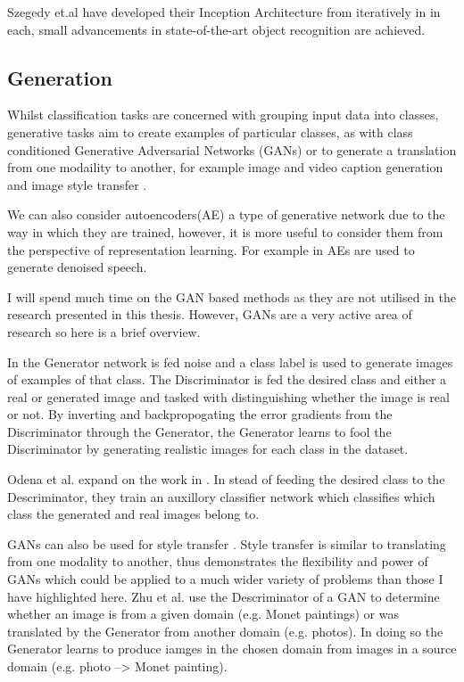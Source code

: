 Szegedy et.al have developed their Inception Architecture from \cite{szegedy2015going} iteratively in \cite{szegedy2016rethinking, szegedy2017inception} in each, small advancements in state-of-the-art object recognition are achieved.


\subsection{Generation}
Whilst classification tasks are concerned with grouping input data into classes, generative tasks aim to create examples of particular classes, as with class conditioned Generative Adversarial Networks (GANs) \cite{mirza2014conditional, odena2017conditional} or to generate a translation from one modaility to another, for example image and video caption generation \cite{vinyals2015show, lebret2015phrase, donahue2015long, jia2015guiding, rohrbach2014coherent, rohrbach2013translating, yao2015describing, yao2015video, venugopalan2014translating, johnson2016densecap, ordonez2011im2text} and image style transfer \cite{zhu2017unpaired}.

We can also consider autoencoders(AE) a type of generative network due to the way in which they are trained, however, it is more useful to consider them from the perspective of representation learning. For example in \cite{lu2013speech} AEs are used to generate denoised speech.

I will spend much time on the GAN based methods as they are not utilised in the research presented in this thesis. However, GANs are a very active area of research so here is a brief overview. 

In \cite{mirza2014conditional} the Generator network is fed noise and a class label is used to generate images of examples of that class. The Discriminator is fed the desired class and either a real or generated image and tasked with distinguishing whether the image is real or not. By inverting and backpropogating the error gradients from the Discriminator through the Generator, the Generator learns to fool the Discriminator by generating realistic images for each class in the dataset.

Odena et al. \cite{odena2017conditional} expand on the work in \cite{mirza2014conditional}. In stead of feeding the desired class to the Descriminator, they train an auxillory classifier network which classifies which class the generated and real images belong to.

GANs can also be used for style transfer \cite{zhu2017unpaired}. Style transfer is similar to translating from one modality to another, thus \cite{zhu2017unpaired} demonstrates the flexibility and power of GANs which could be applied to a much wider variety of problems than those I have highlighted here. Zhu et al. use the Descriminator of a GAN to determine whether an image is from a given domain (e.g. Monet paintings) or was translated by the Generator from another domain (e.g. photos). In doing so the Generator learns to produce iamges in the chosen domain from images in a source domain (e.g. photo --> Monet painting).

